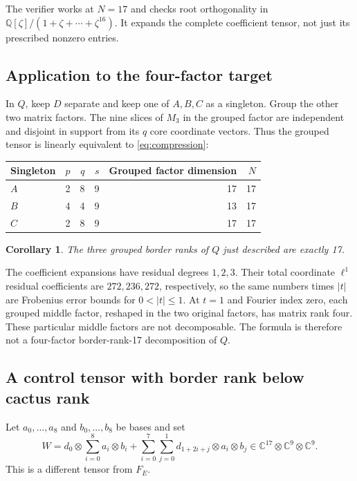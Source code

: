 \documentclass[11pt]{article}
\newtheorem{corollary}[theorem]{Corollary}
\theoremstyle{definition}\newtheorem{definition}[theorem]{Definition}
\theoremstyle{remark}\newtheorem{remark}[theorem]{Remark}
\newcommand{\C}{\mathbb C}
\newcommand{\Q}{\mathbb Q}
\begin{document}
The verifier works at $N=17$ and checks root orthogonality in
$\Q[\zeta]/(1+\zeta+\cdots+\zeta^{16})$. It expands the complete coefficient
tensor, not just its prescribed nonzero entries.

\subsection{Application to the four-factor target}

In $Q$, keep $D$ separate and keep one of $A,B,C$ as a singleton. Group the
other two matrix factors. The nine slices of $M_3$ in the grouped factor are
independent and disjoint in support from its $q$ core coordinate vectors.
Thus the grouped tensor is linearly equivalent to \eqref{eq:compression}:
\begin{center}
\begin{tabular}{lrrrrr}
\toprule
Singleton&$p$&$q$&$s$&Grouped factor dimension&$N$\\
\midrule
$A$&2&8&9&17&17\\
$B$&4&4&9&13&17\\
$C$&2&8&9&17&17\\
\bottomrule
\end{tabular}
\end{center}

\begin{corollary}\label{cor:grouped}
The three grouped border ranks of $Q$ just described are exactly 17.
\end{corollary}

The coefficient expansions have residual degrees $1,2,3$. Their total
coordinate $\ell^1$ residual coefficients are $272,236,272$, respectively,
so the same numbers times $|t|$ are Frobenius error bounds for $0<|t|\leq1$.
At $t=1$ and Fourier index zero, each grouped middle factor, reshaped in the
two original factors, has matrix rank four. These particular middle factors
are not decomposable. The formula is therefore not a four-factor
border-rank-17 decomposition of $Q$.

\subsection{A control tensor with border rank below cactus rank}\label{sec:control}

Let $a_0,\ldots,a_8$ and $b_0,\ldots,b_8$ be bases and set
\begin{equation}\label{eq:control}
 W=d_0\otimes\sum_{i=0}^{8}a_i\otimes b_i
  +\sum_{i=0}^{7}\sum_{j=0}^{1}d_{1+2i+j}\otimes a_i\otimes b_j
       \in\C^{17}\otimes\C^9\otimes\C^9.
\end{equation}
This is a different tensor from $F_E$.
\end{document}
